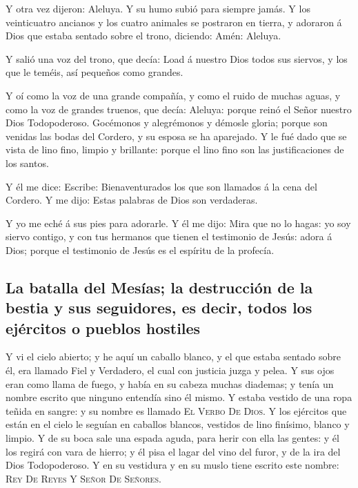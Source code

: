  Y otra vez dijeron: Aleluya. Y su humo subió para siempre
jamás.  Y los veinticuatro ancianos y los cuatro animales
se postraron en tierra, y adoraron á Dios que estaba sentado sobre el
trono, diciendo: Amén: Aleluya.

 Y salió una voz del trono, que decía: Load á nuestro Dios
todos sus siervos, y los que le teméis, así pequeños como grandes.

 Y oí como la voz de una grande compañía, y como el ruido
de muchas aguas, y como la voz de grandes truenos, que decía: Aleluya:
porque reinó el Señor nuestro Dios Todopoderoso. 
Gocémonos y alegrémonos y démosle gloria; porque son venidas las bodas
del Cordero, y su esposa se ha aparejado.  Y le fué dado
que se vista de lino fino, limpio y brillante: porque el lino fino son
las justificaciones de los santos.

 Y él me dice: Escribe: Bienaventurados los que son
llamados á la cena del Cordero. Y me dijo: Estas palabras de Dios son
verdaderas.

 Y yo me eché á sus pies para adorarle. Y él me dijo:
Mira que no lo hagas: yo soy siervo contigo, y con tus hermanos que
tienen el testimonio de Jesús: adora á Dios; porque el testimonio de
Jesús es el espíritu de la profecía.

\hypertarget{la-batalla-del-mesuxedas-la-destrucciuxf3n-de-la-bestia-y-sus-seguidores-es-decir-todos-los-ejuxe9rcitos-o-pueblos-hostiles}{%
\subsection{La batalla del Mesías; la destrucción de la bestia y sus
seguidores, es decir, todos los ejércitos o pueblos
hostiles}\label{la-batalla-del-mesuxedas-la-destrucciuxf3n-de-la-bestia-y-sus-seguidores-es-decir-todos-los-ejuxe9rcitos-o-pueblos-hostiles}}

 Y vi el cielo abierto; y he aquí un caballo blanco, y el
que estaba sentado sobre él, era llamado Fiel y Verdadero, el cual con
justicia juzga y pelea.  Y sus ojos eran como llama de
fuego, y había en su cabeza muchas diademas; y tenía un nombre escrito
que ninguno entendía sino él mismo.  Y estaba vestido de
una ropa teñida en sangre: y su nombre es llamado \textsc{El}
\textsc{Verbo} \textsc{De} \textsc{Dios}.  Y los
ejércitos que están en el cielo le seguían en caballos blancos, vestidos
de lino finísimo, blanco y limpio.  Y de su boca sale una
espada aguda, para herir con ella las gentes: y él los regirá con vara
de hierro; y él pisa el lagar del vino del furor, y de la ira del Dios
Todopoderoso.  Y en su vestidura y en su muslo tiene
escrito este nombre: \textsc{Rey} \textsc{De} \textsc{Reyes} Y
\textsc{Señor} \textsc{De} \textsc{Señores}.

